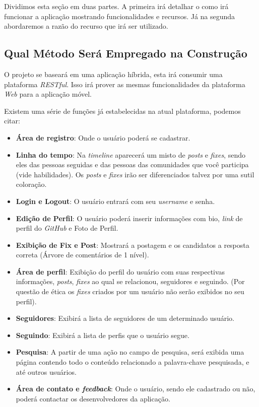 \documentclass[
	article,			%
	11pt,				%
	oneside,			%
	a4paper,			%
	english,			%
	brazil,				%
	sumario=tradicional
	]{abntex2}
\begin{document}
Dividimos esta seção em duas partes. A primeira irá detalhar o como irá funcionar a aplicação mostrando funcionalidades e recursos. Já na segunda abordaremos a razão do recurso que irá ser utilizado.

\subsection{Qual Método Será Empregado na Construção}

O projeto se baseará em uma aplicação híbrida, esta irá consumir uma plataforma \textit{RESTful}. Isso irá prover as mesmas funcionalidades da plataforma \textit{Web} para a aplicação móvel.

Existem uma série de funções já estabelecidas na atual plataforma, podemos citar:

\begin{itemize}
	\item \textbf{Área de registro}: Onde o usuário poderá se cadastrar.
	\item \textbf{Linha do tempo}: Na \textit{timeline} aparecerá um misto de \textit{posts} e \textit{fixes}, sendo eles das pessoas seguidas e das pessoas das comunidades que você participa (vide habilidades). Os \textit{posts} e \textit{fixes} irão ser diferenciados talvez por uma sutil coloração.
	\item \textbf{Login e Logout}: O usuário entrará com seu \textit{username} e senha.
	\item\textbf{Edição de Perfil}: O usuário poderá inserir informações com bio, \textit{link} de perfil do \textit{GitHub} e Foto de Perfil.
	\item \textbf{Exibição de Fix e Post}: Mostrará a postagem e os candidatos a resposta correta (Árvore de comentários de 1 nível).
	\item \textbf{Área de perfil}: Exibição do perfil do usuário com suas respectivas informações, \textit{posts}, \textit{fixes} ao qual se relacionou, seguidores e seguindo. (Por questão de ética os \textit{fixes} criados por um usuário não serão exibidos no seu perfil).
	\item \textbf{Seguidores}: Exibirá a lista de seguidores de um determinado usuário.
	\item \textbf{Seguindo}: Exibirá a lista de perfis que o usuário segue.
	\item \textbf{Pesquisa}: A partir de uma ação no campo de pesquisa, será exibida uma página contendo todo o conteúdo relacionado a palavra-chave pesquisada, e até outros usuários.
	\item \textbf{Área de contato e \textit{feedback}}: Onde o usuário, sendo ele cadastrado ou não, poderá contactar os desenvolvedores da aplicação.
	
\end{itemize}
\end{document}
